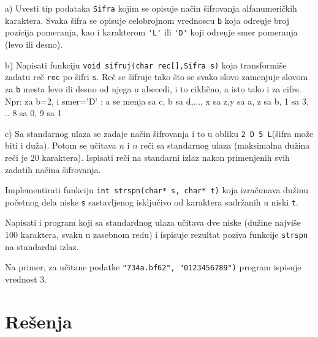 \begin{Exercise}[label=p2.3_] 
\begin{description}
 \item {a)} Uvesti tip podataka \verb|Sifra| kojim se opisuje na\v cin
   \v sifrovanja alfanumeri\v ckih karaktera.  Svaka \v sifra se
   opisuje celobrojnom vrednoscu \verb|b| koja odre\d uje broj
   pozicija pomeranja, kao i karakterom \verb|'L'| ili \verb|'D'| koji
   odre\d uje smer pomeranja (levo ili desno).
  \item{b)} Napisati funkciju \verb|void sifruj(char rec[],Sifra s)|
    koja transformi\v se zadatu re\v c \verb|rec| po \v sifri
    \verb|s|. Re\v c se \v sifruje tako \v sto se svako slovo
    zamenjuje slovom za \verb|b| mesta levo ili desno od njega u
    abecedi, i to cikli\v cno, a isto tako i za cifre.\\ Npr: za b=2,
    i smer='D' : a se menja sa c, b sa d,..., x sa z,y sa a, z sa b, 1
    sa 3, .. 8 sa 0, 9 sa 1
 \item{c)} Sa standarnog ulaza se zadaje na\v cin \v sifrovanja i to u
   obliku \verb|2 D 5 L|(\v sifra mo\v ze biti i du\v za). Potom se
   u\v citava $n$ i $n$ re\v ci sa standarnog ulaza (maksimalna du\v
   zina re\v ci je 20 karaktera).  Ispisati re\v ci na standarni izlaz
   nakon primenjenih svih zadatih na\v cina \v sifrovanja.
\end{description}
\end{Exercise}
\begin{Answer}[ref=p2.3_]
\end{Answer}


\begin{Exercise}[label=p2.3_] 
Implementirati funkciju \verb|int strspn(char* s, char* t)|
koja izra\v cunava du\v zinu po\v cetnog dela niske \verb|s| sastavljenog
isklju\v civo od karaktera sadr\v zanih u niski \verb|t|.

Napisati i program koji sa standardnog ulaza u\v citava dve niske (du\v zine
najvi\v se 100 karaktera, svaku u zasebnom redu) i ispisuje rezultat poziva
funkcije \verb|strspn| na standardni izlaz.

Na primer, za u\v{c}itane podatke \verb|"734a.bf62", "0123456789")| program
ispisuje vrednost 3.
\end{Exercise}
\begin{Answer}[ref=p2.3_]
\end{Answer}


\section{Rešenja}
\shipoutAnswer


